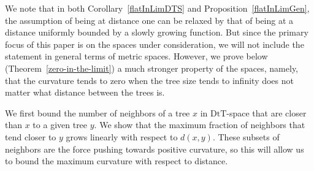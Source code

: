 \documentclass{amsart}
\newcommand{\dts}{\mathrm{DtT}}
\begin{document}
We note that in both Corollary~\ref{flatInLimDTS} and Proposition~\ref{flatInLimGen}, the assumption of being at distance one can be relaxed by that of being at a distance uniformly bounded by a slowly growing function.
But since the primary focus of this paper is on the spaces under consideration, we will not  include the statement in general terms of metric spaces.
However, we prove below (Theorem~\ref{zero-in-the-limit}) a much stronger property of the spaces, namely, that the curvature tends to zero when the tree size tends to infinity does not matter what distance between the trees is.

We first bound the number of neighbors of a tree $x$ in $\dts$-space that are closer than $x$ to a given tree $y$.
We show that the maximum fraction of neighbors that tend closer to $y$ grows linearly with respect to $d(x,y)$.
These subsets of neighbors are the force pushing towards positive curvature, so this will allow us to bound the maximum curvature with respect to distance.
\end{document}
